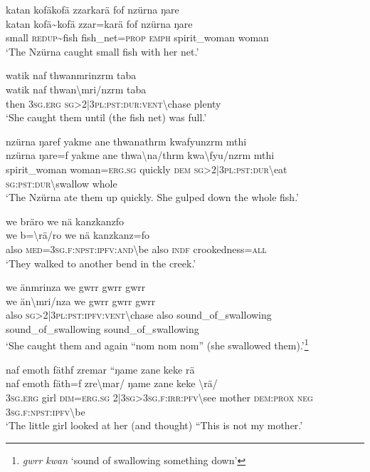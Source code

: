 \ea\label{ex:6:a1223}
katan kofäkofä zzarkarä fof nzürna ŋare\\
\gll katan	kofä{\textasciitilde}kofä	zzar=karä	fof	nzürna	ŋare\\
     small	\textsc{redup}{\textasciitilde}fish	fish\_net=\textsc{prop}	\textsc{emph}	spirit\_woman	woman\\
\glt `The Nzürna caught small fish with her net.'
\z

\ea\label{ex:6:a1225}
watik naf thwanmrinzrm taba\\
\gll watik	naf	thwan{\textbackslash}mri/nzrm	taba\\
     then	3\textsc{sg}.\textsc{erg}	\textsc{sg}>2|3\textsc{pl}:\textsc{pst}:\textsc{dur}:\textsc{vent}{\textbackslash}chase	plenty\\
\glt `She caught them until (the fish net) was full.'
\z

\ea\label{ex:6:a1226}
nzürna ŋaref yakme ane thwanathrm kwafyunzrm mthi\\
\gll nzürna	ŋare=f	yakme	ane	thwa{\textbackslash}na/thrm	kwa{\textbackslash}fyu/nzrm	mthi\\
     spirit\_woman	woman=\textsc{erg}.\textsc{sg}	quickly	\textsc{dem}	\textsc{sg}>2|3\textsc{pl}:\textsc{pst}:\textsc{dur}{\textbackslash}eat	\textsc{sg}:\textsc{pst}:\textsc{dur}{\textbackslash}swallow	whole\\
\glt `The Nzürna ate them up quickly. She gulped down the whole fish.'
\z

\ea\label{ex:6:a1227}
we bräro we nä kanzkanzfo\\
\gll we	b={\textbackslash}rä/ro	we	nä	kanzkanz=fo\\
     also	\textsc{med}=3\textsc{sg}.\textsc{f}:\textsc{npst}:\textsc{ipfv}:\textsc{and}{\textbackslash}be	also	\textsc{indf}	crookedness=\textsc{all}\\
\glt `They walked to another bend in the creek.'
\z

\ea\label{ex:6:a1229}
we änmrinza we gwrr gwrr gwrr\\
\gll we	än{\textbackslash}mri/nza	we	gwrr	gwrr	gwrr\\
     also	\textsc{sg}>2|3\textsc{pl}:\textsc{pst}:\textsc{ipfv}:\textsc{vent}{\textbackslash}chase	also	sound\_of\_swallowing	sound\_of\_swallowing	sound\_of\_swallowing\\
\glt `She caught them and again ``nom nom nom'' (she swallowed them).'\footnote{\textit{gwrr kwan} `sound of swallowing something down'}
\z

\ea\label{ex:6:a1230}
naf emoth fäthf zremar ``ŋame zane keke rä\\
\gll naf	emoth	fäth=f	zre{\textbackslash}mar/	ŋame	zane	keke	{\textbackslash}rä/\\
     3\textsc{sg}.\textsc{erg}	girl	\textsc{dim}=\textsc{erg}.\textsc{sg}	2|3\textsc{sg}>3\textsc{sg}.\textsc{f}:\textsc{irr}:\textsc{pfv}{\textbackslash}see	mother	\textsc{dem}:\textsc{prox}	\textsc{neg}	3\textsc{sg}.\textsc{f}:\textsc{npst}:\textsc{ipfv}{\textbackslash}be\\
\glt `The little girl looked at her (and thought) ``This is not my mother.'
\z


